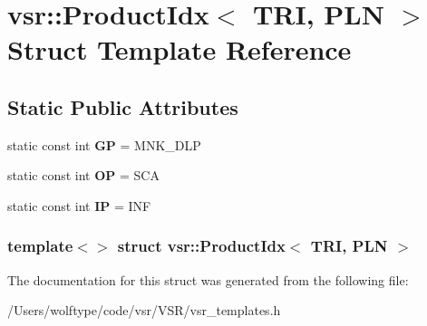 \hypertarget{structvsr_1_1_product_idx_3_01_t_r_i_00_01_p_l_n_01_4}{\section{vsr\-:\-:Product\-Idx$<$ T\-R\-I, P\-L\-N $>$ Struct Template Reference}
\label{structvsr_1_1_product_idx_3_01_t_r_i_00_01_p_l_n_01_4}
}
\subsection*{Static Public Attributes}
\begin{DoxyCompactItemize}
\item 
\hypertarget{structvsr_1_1_product_idx_3_01_t_r_i_00_01_p_l_n_01_4_a790fb8add29c8eac87abfd2fac22fd1f}{static const int {\bfseries G\-P} = M\-N\-K\-\_\-\-D\-L\-P}\label{structvsr_1_1_product_idx_3_01_t_r_i_00_01_p_l_n_01_4_a790fb8add29c8eac87abfd2fac22fd1f}

\item 
\hypertarget{structvsr_1_1_product_idx_3_01_t_r_i_00_01_p_l_n_01_4_a210bba079e8bd8fe578199d76d8eb43c}{static const int {\bfseries O\-P} = S\-C\-A}\label{structvsr_1_1_product_idx_3_01_t_r_i_00_01_p_l_n_01_4_a210bba079e8bd8fe578199d76d8eb43c}

\item 
\hypertarget{structvsr_1_1_product_idx_3_01_t_r_i_00_01_p_l_n_01_4_aa1de7d327a8a5c5638325f72ef04fdc3}{static const int {\bfseries I\-P} = I\-N\-F}\label{structvsr_1_1_product_idx_3_01_t_r_i_00_01_p_l_n_01_4_aa1de7d327a8a5c5638325f72ef04fdc3}

\end{DoxyCompactItemize}
\subsubsection*{template$<$$>$ struct vsr\-::\-Product\-Idx$<$ T\-R\-I, P\-L\-N $>$}



The documentation for this struct was generated from the following file\-:\begin{DoxyCompactItemize}
\item 
/\-Users/wolftype/code/vsr/\-V\-S\-R/vsr\-\_\-templates.\-h\end{DoxyCompactItemize}
